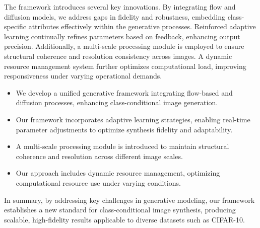 The framework introduces several key innovations. By integrating flow and diffusion models, we address gaps in fidelity and robustness, embedding class-specific attributes effectively within the generative processes. Reinforced adaptive learning continually refines parameters based on feedback, enhancing output precision. Additionally, a multi-scale processing module is employed to ensure structural coherence and resolution consistency across images. A dynamic resource management system further optimizes computational load, improving responsiveness under varying operational demands.

\begin{itemize}
    \item We develop a unified generative framework integrating flow-based and diffusion processes, enhancing class-conditional image generation.
    \item Our framework incorporates adaptive learning strategies, enabling real-time parameter adjustments to optimize synthesis fidelity and adaptability.
    \item A multi-scale processing module is introduced to maintain structural coherence and resolution across different image scales.
    \item Our approach includes dynamic resource management, optimizing computational resource use under varying conditions.
\end{itemize}

In summary, by addressing key challenges in generative modeling, our framework establishes a new standard for class-conditional image synthesis, producing scalable, high-fidelity results applicable to diverse datasets such as CIFAR-10.
